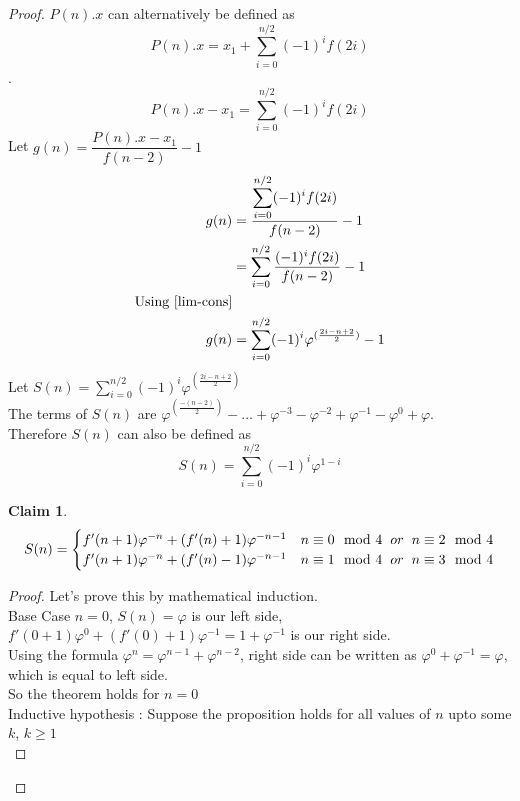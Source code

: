 \documentclass[preprint,12pt]{elsarticle}
\newtheorem{claim}{Claim}
\begin{document}
	\begin{proof}
		$P(n).x$ can alternatively be defined as $$P(n).x = x_1 + \sum_{i = 0}^{n / 2}(-1)^i f(2i)$$.
		$$P(n).x - x_1 = \sum_{i = 0}^{n / 2}(-1)^i f(2i)$$
		Let $g(n) = \dfrac{P(n).x - x_1}{f(n - 2)} - 1$
		\begin{align*}
		g(n) &= \dfrac{\displaystyle\sum_{i = 0}^{n / 2}(-1)^i f(2i)}{f(n - 2)} - 1\\
		&= \sum_{i = 0}^{n / 2}\dfrac{(-1)^i f(2i)}{f(n - 2)} - 1\\
		\text{Using \ref{lim-cons}}\\
		g(n) &= \sum_{i = 0}^{n / 2}(-1)^i \varphi^{(\frac{2i - n + 2}{2})}- 1
		\end{align*}
		Let $S(n) = \displaystyle\sum_{i = 0}^{n/2}(-1)^i \varphi^{(\frac{2i-n+2}{2})}$\\
		The terms of $S(n)$ are $\varphi^{(\frac{-(n - 2)}{2})} - \ldots + \varphi^{-3} - \varphi^{-2} + \varphi^{-1} -\varphi^0 + \varphi$.\\
		Therefore $S(n)$ can also be defined as $$S(n) = \sum_{i = 0}^{n / 2}(-1)^i \varphi^{1 - i}$$
		\begin{claim}
			\begin{equation*}
			S(n) = \begin{cases}
			f'(n + 1)\varphi^{-n} + (f'(n) + 1)\varphi^{-n-1} & n\equiv0\mod4\hspace{2mm} or\hspace{2mm} n\equiv2\mod4\\
			f'(n + 1)\varphi^{-n} + (f'(n) - 1)\varphi^{-n-1} &
			n\equiv1\mod4\hspace{2mm} or\hspace{2mm} n\equiv3\mod4
			\end{cases}
			\end{equation*}
		\end{claim}
		\begin{proof}
			Let's prove this by mathematical induction.\\
			Base Case $n=0$, $S(n) = \varphi$ is our left side, $f'(0 + 1)\varphi^0 + (f'(0) + 1)\varphi^{-1} = 1 + \varphi^{-1}$ is our right side.\\
			Using the formula $\varphi^n = \varphi^{n - 1} + \varphi^{n - 2}$\cite{Powerp}, right side can be written as $\varphi^0 + \varphi^{-1} = \varphi$, which is equal to left side.\\
			So the theorem holds for $n = 0$\\
			Inductive hypothesis : Suppose the proposition holds for all values of $n$ upto some $k$, $k \geq 1$\\

\end{proof}
\end{proof}
\end{document}
